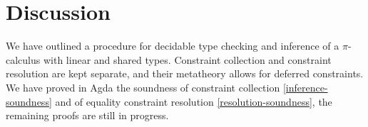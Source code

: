 \documentclass[sigplan,screen,review]{acmart}
\theoremstyle{definition}\newtheorem{mytheorem}{Theorem}[section]
\newcommand{\picalc}{$\pi$-calculus}
\begin{document}
\section{Discussion}

We have outlined a procedure for decidable type checking and inference of a \picalc{} with linear and shared types.
Constraint collection and constraint resolution are kept separate, and their metatheory allows for deferred constraints.
We have proved in Agda the soundness of constraint collection \autoref{inference-soundness} and of equality constraint resolution \autoref{resolution-soundness}, the remaining proofs are still in progress.



\end{document}

